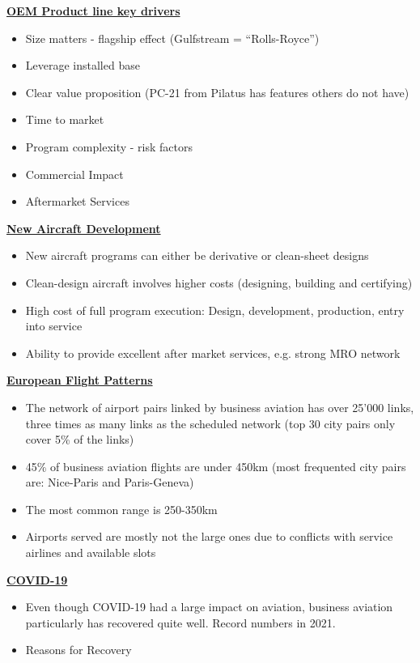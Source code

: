 \documentclass[9pt, landscape, fleqn]{scrartcl}
\begin{document}
\begin{multicols*}{3}
\begin{itemize}
\end{itemize}
\underline{\textbf{OEM Product line key drivers}}
\begin{itemize}
    \item Size matters - flagship effect (Gulfstream = ``Rolls-Royce'') 
    \item Leverage installed base 
    \item Clear value proposition (PC-21 from Pilatus has features others do not have)
    \item Time to market 
    \item Program complexity - risk factors 
    \item Commercial Impact 
    \item Aftermarket Services 
\end{itemize}
\underline{\textbf{New Aircraft Development}}
\begin{itemize}
    \item New aircraft programs can either be derivative or clean-sheet designs 
    \item Clean-design aircraft involves higher costs (designing, building and certifying)
    \item High cost of full program execution: Design, development, production, entry into service 
    \item Ability to provide excellent after market services, e.g. strong MRO network 
\end{itemize}
\underline{\textbf{European Flight Patterns}}
\begin{itemize}
    \item The network of airport pairs linked by business aviation has over 25'000 links, three times as many links as the scheduled network (top 30 city pairs only cover 5\% of the links)
    \item 45\% of business aviation flights are under 450km (most frequented city pairs are: Nice-Paris and Paris-Geneva)
    \item The most common range is 250-350km
    \item Airports served are mostly not the large ones due to conflicts with service airlines and available slots
\end{itemize}
\underline{\textbf{COVID-19}}
\begin{itemize}
    \item Even though COVID-19 had a large impact on aviation, business aviation particularly has recovered quite well. Record numbers in 2021. 
    \item Reasons for Recovery 

\end{itemize}
\end{multicols*}
\end{document}
